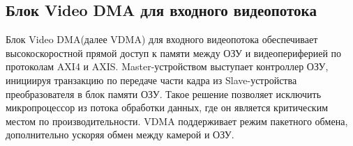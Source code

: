 
\subsection{Блок Video DMA для входного видеопотока}
\label{sec:structural:vdma_in}
Блок Video DMA(далее VDMA) для входного видеопотока обеспечивает высокоскоростной прямой доступ к памяти
между ОЗУ и видеопериферией по протоколам AXI4 и AXIS. Master-устройством выступает контроллер ОЗУ,
инициируя транзакцию по передаче части кадра из Slave-устройства преобразователя в блок памяти ОЗУ.
Такое решение позволяет исключить микропроцессор из потока обработки данных, где он является
критическим местом по производительности. VDMA поддерживает режим пакетного обмена, дополнительно
ускоряя обмен между камерой и ОЗУ.
